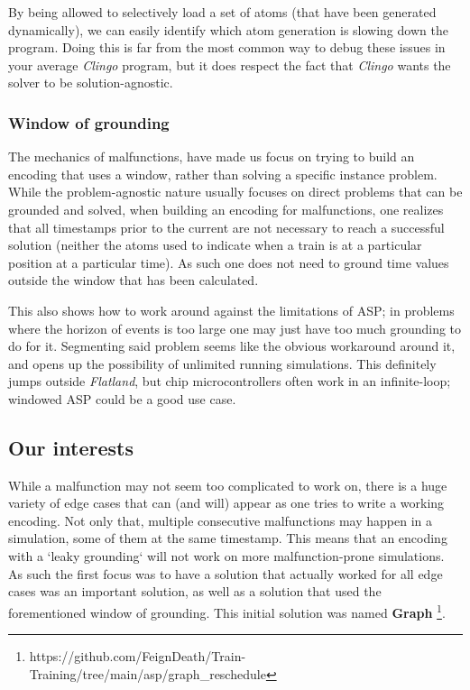 By being allowed to selectively load a set of atoms (that have been generated dynamically), we can easily identify which atom generation is slowing down the program. Doing this is far from the most common way to debug these issues in your average \textit{Clingo} program, but it does respect the fact that \textit{Clingo} wants the solver to be solution-agnostic. 


\subsubsection{Window of grounding}
\label{sec:window}
The mechanics of malfunctions, have made us focus on trying to build an encoding that uses a window, rather than solving a specific instance problem. While the problem-agnostic nature usually focuses on direct problems that can be grounded and solved, when building an encoding for malfunctions, one realizes that all timestamps prior to the current are not necessary to reach a successful solution (neither the atoms used to indicate when a train is at a particular position at a particular time). As such one does not need to ground time values outside the window that has been calculated.

This also shows how to work around against the limitations of ASP; in problems where the horizon of events is too large one may just have too much grounding to do for it. Segmenting said problem seems like the obvious workaround around it, and opens up the possibility of unlimited running simulations. This definitely jumps outside \textit{Flatland}, but chip microcontrollers often work in an infinite-loop; windowed ASP could be a good use case.
  

\subsection{Our interests}
While a malfunction may not seem too complicated to work on, there is a huge variety of edge cases that can (and will) appear as one tries to write a working encoding. Not only that, multiple consecutive malfunctions may happen in a simulation, some of them at the same timestamp. This means that an encoding with a `leaky grounding` will not work on more malfunction-prone simulations. As such the first focus was to have a solution that actually worked for all edge cases was an important solution, as well as a solution that used the forementioned window of grounding. This initial solution was named \textbf{Graph} \footnote{https://github.com/FeignDeath/Train-Training/tree/main/asp/graph\_reschedule}. 


